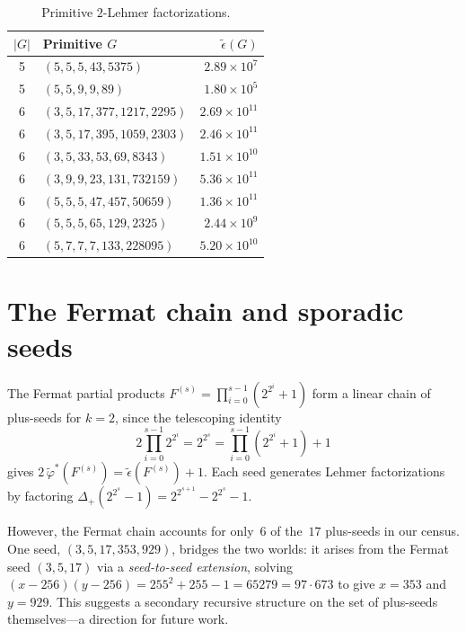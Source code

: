 \documentclass[11pt]{article}
\theoremstyle{definition}
\theoremstyle{remark}
\newcommand{\eps}{\tilde{\epsilon}}
\newcommand{\phist}{\tilde{\varphi}^*}
\begin{document}
\begin{table}[ht]
\centering
\caption{Primitive $2$-Lehmer factorizations.}\label{tab:primitives}
\smallskip
\begin{tabular}{@{}clr@{}}
\toprule
$|G|$ & Primitive $G$ & $\eps(G)$ \\
\midrule
5 & $(5, 5, 5, 43, 5375)$ & $2.89 \times 10^7$ \\
5 & $(5, 5, 9, 9, 89)$ & $1.80 \times 10^5$ \\
6 & $(3, 5, 17, 377, 1217, 2295)$ & $2.69 \times 10^{11}$ \\
6 & $(3, 5, 17, 395, 1059, 2303)$ & $2.46 \times 10^{11}$ \\
6 & $(3, 5, 33, 53, 69, 8343)$ & $1.51 \times 10^{10}$ \\
6 & $(3, 9, 9, 23, 131, 732159)$ & $5.36 \times 10^{11}$ \\
6 & $(5, 5, 5, 47, 457, 50659)$ & $1.36 \times 10^{11}$ \\
6 & $(5, 5, 5, 65, 129, 2325)$ & $2.44 \times 10^{9}$ \\
6 & $(5, 7, 7, 7, 133, 228095)$ & $5.20 \times 10^{10}$ \\
\bottomrule
\end{tabular}
\end{table}


\section{The Fermat chain and sporadic seeds}

The Fermat partial products $F^{(s)} = \prod_{i=0}^{s-1}(2^{2^i}+1)$
form a linear chain of plus-seeds for $k = 2$, since the telescoping
identity
\[
  2\prod_{i=0}^{s-1} 2^{2^i}
    = 2^{2^s}
    = \prod_{i=0}^{s-1}(2^{2^i}+1) + 1
\]
gives $2\,\phist(F^{(s)}) = \eps(F^{(s)}) + 1$.  Each seed generates
Lehmer factorizations by factoring
$\Delta_+(2^{2^s}\!-\!1) = 2^{2^{s+1}} - 2^{2^s} - 1$.

However, the Fermat chain accounts for only~$6$ of the~$17$ plus-seeds in
our census.  One seed, $(3, 5, 17, 353, 929)$, bridges the two worlds:
it arises from the Fermat seed $(3,5,17)$ via a
\emph{seed-to-seed extension}, solving
$(x - 256)(y - 256) = 255^2 + 255 - 1 = 65279 = 97 \cdot 673$ to give
$x = 353$ and $y = 929$.  This suggests a secondary recursive structure on
the set of plus-seeds themselves---a direction for future work.
\end{document}
